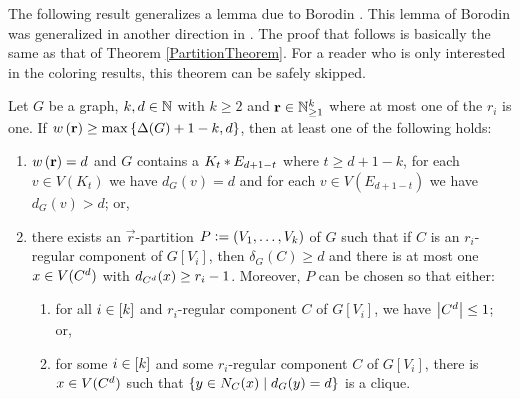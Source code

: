 The following result generalizes a lemma due to Borodin \cite{borodin1976decomposition}.  This lemma of Borodin was generalized in another direction in \cite{borodin2000variable}.  The proof that follows is basically the same as that of Theorem \ref{PartitionTheorem}.  For a reader who is only interested in the coloring results, this theorem can be safely skipped.	

		\begin{thm}\label{DegenProp}
			Let $G$ be a graph, $k,d \in \mathbb{N}$ with $k \geq 2$ and $\mathbf{r} \in \mathbb{N}_{\geq 1}^k$ where at most one of the $r_i$ is one.  If $w\left( \mathbf{r} \right) \geq \max\left\{ \Delta(G) + 1 - k, d \right\}$, then at least one of the following holds:
			\begin{enumerate}
			  \item $w\left( \mathbf{r} \right) = d$ and $G$ contains a $K_t \mbox{\hspace{2 pt}$\ast$\hspace{2 pt}} E_{d+1-t}$ where $t \geq d +
			  1 - k$, for each $v \in V(K_t)$ we have $d_G(v) = d$ and for each $v \in
			  V(E_{d+1-t})$ we have $d_G(v) > d$; or,
			  \item there exists an $\vec{r}$-partition $P \mathrel{\mathop:}= \left( V_1, \ldots, V_k \right)$ of 	
$G$ such that if $C$ is an $r_i$-regular component of $G[V_i]$, then $\delta_G(C) \geq d$ and
			  there is at most one $x \in V(C^{d})$ with $d_{C^{d}}(x) \geq
			  r_i -1$.  Moreover, $P$ can be chosen so that either: 
			  \begin{enumerate}
			    \item for all $i \in \left[k\right]$ and $r_i$-regular component $C$ of
			    $G[V_i]$, we have $\left|C^{d}\right| \leq 1$; or,
			  	\item  for some $i \in \left[k\right]$ and some $r_i$-regular component $C$ of
			  	$G[V_i]$, there is $x \in V(C^{d})$ such that
			  	$\left\{ y \in N_C(x) \mid d_G(y) = d \right\}$ is a clique.
			  \end{enumerate}
			\end{enumerate}
		\end{thm}
